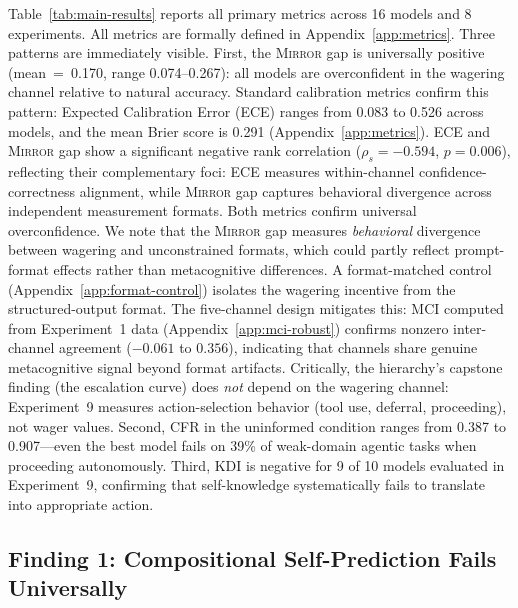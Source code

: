 \documentclass[10pt]{article}
\newcommand{\mirror}{\textsc{Mirror}}
\newcommand{\KDI}{KDI}
\newcommand{\CFR}{CFR}
\begin{document}
Table~\ref{tab:main-results} reports all primary metrics across 16 models and 8
experiments. All metrics are formally defined in Appendix~\ref{app:metrics}. Three patterns are immediately visible. First, the \mirror{} gap is
universally positive (mean~=~0.170, range 0.074--0.267): all models are
overconfident in the wagering channel relative to natural accuracy.
Standard calibration metrics confirm this pattern: Expected Calibration Error (ECE)
ranges from 0.083 to 0.526 across models, and the mean Brier score is 0.291
(Appendix~\ref{app:metrics}). ECE and \mirror{} gap show a significant negative
rank correlation ($\rho_s = -0.594$, $p = 0.006$), reflecting their
complementary foci: ECE measures within-channel confidence-correctness alignment,
while \mirror{} gap captures behavioral divergence across independent measurement
formats. Both metrics confirm universal overconfidence.
We note that the \mirror{} gap measures \emph{behavioral} divergence between
wagering and unconstrained formats, which could partly reflect prompt-format
effects rather than metacognitive differences. A format-matched control (Appendix~\ref{app:format-control}) isolates the wagering incentive from the structured-output format. The five-channel design mitigates
this: MCI computed from Experiment~1 data (Appendix~\ref{app:mci-robust}) confirms
nonzero inter-channel agreement ($-0.061$ to $0.356$), indicating that channels
share genuine metacognitive signal beyond format artifacts. Critically, the
hierarchy's capstone finding (the escalation curve) does \emph{not} depend on the
wagering channel: Experiment~9 measures action-selection behavior (tool use,
deferral, proceeding), not wager values. Second, \CFR{}
in the uninformed condition ranges from 0.387 to 0.907---even the best model fails
on 39\% of weak-domain agentic tasks when proceeding autonomously. Third, \KDI{}
is negative for 9 of 10 models evaluated in Experiment~9, confirming that
self-knowledge systematically fails to translate into appropriate action.



\subsection{Finding 1: Compositional Self-Prediction Fails Universally}
\end{document}
